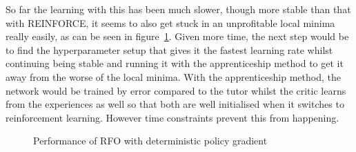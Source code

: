 So far the learning with this has been much slower, though more stable than that with REINFORCE, it seems to also get stuck in an unprofitable local minima really easily, as can be seen in figure~\ref{fig:detpolgrad}. Given more time, the next step would be to find the hyperparameter setup that gives it the fastest learning rate whilst continuing being stable and running it with the apprenticeship method to get it away from the worse of the local minima. With the apprenticeship method, the network would be trained by error compared to the tutor whilst the critic learns from the experiences as well so that both are well initialised when it switches to reinforcement learning. However time constraints prevent this from happening.

\begin{figure}
\centering

\caption{Performance of RFO with deterministic policy gradient}
\label{fig:detpolgrad}
\end{figure}

